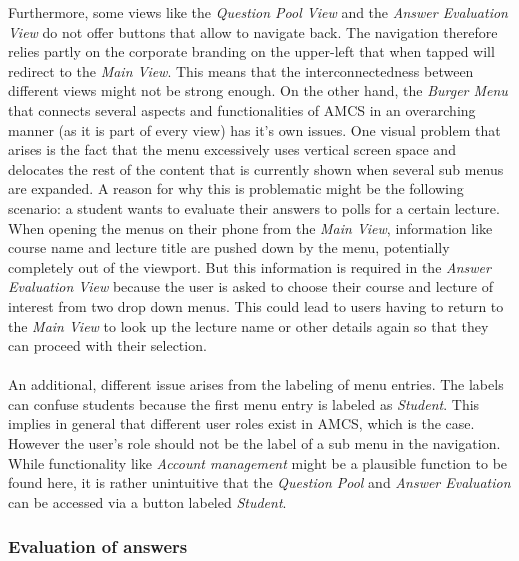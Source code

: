 Furthermore, some views like the \emph{Question Pool View} and the \emph{Answer Evaluation View} do not offer buttons that allow to navigate back. The navigation therefore relies partly on the corporate branding on the upper-left that when tapped will redirect to the \emph{Main View}.
This means that the interconnectedness between different views might not be strong enough.
\newline
\newline
On the other hand, the \emph{Burger Menu} that connects several aspects and functionalities of AMCS in an overarching manner (as it is part of every view) has it's own issues. 
One visual problem that arises is the fact that the menu excessively uses vertical screen space and delocates the rest of the content that is currently shown when several sub menus are expanded. A reason for why this is problematic might be the following scenario: a student wants to evaluate their answers to polls for a certain lecture. When opening the menus on their phone from the \emph{Main View}, information like course name and lecture title are pushed down by the menu, potentially completely out of the viewport. But this information is required in the \emph{Answer Evaluation View} because the user is asked to choose their course and lecture of interest from two drop down menus. This could lead to users having to return to the \emph{Main View} to look up the lecture name or other details again so that they can proceed with their selection.
\\
\\
An additional, different issue arises from the labeling of menu entries. The labels can confuse students because the first menu entry is labeled as \emph{Student}. This implies in general that different user roles exist in AMCS, which is the case. However the user's role should not be the label of a sub menu in the navigation. While functionality like \emph{Account management} might be a plausible function to be found here, it is rather unintuitive that the \emph{Question Pool} and \emph{Answer Evaluation} can be accessed via a button labeled \emph{Student}.

\subsubsection{Evaluation of answers}

